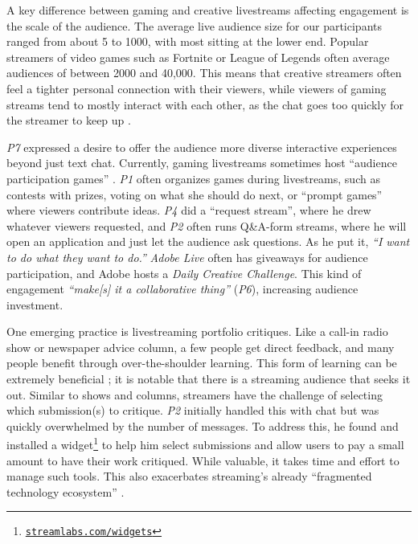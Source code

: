 A key difference between gaming and creative livestreams affecting engagement is the scale of the audience. The average live audience size for our participants ranged from about 5 to 1000, with most sitting at the lower end. Popular streamers of video games such as Fortnite or League of Legends often average audiences of between 2000 and 40,000. This means that creative streamers often feel a tighter personal connection with their viewers, while viewers of gaming streams tend to mostly interact with each other, as the chat goes too quickly for the streamer to keep up \cite{Lessel2017, Hu2017}.

\textit{P7} expressed a desire to offer the audience more diverse interactive experiences beyond just text chat. Currently, gaming livestreams sometimes host ``audience participation games'' \cite{Glickman2018}. \textit{P1} often organizes games during livestreams, such as contests with prizes, voting on what she should do next, or ``prompt games'' where viewers contribute ideas. \textit{P4} did a ``request stream'', where he drew whatever viewers requested, and \textit{P2} often runs Q\&A-form streams, where he will open an application and just let the audience ask questions. As he put it, \textit{``I want to do what they want to do.''} \textit{Adobe Live} often has giveaways for audience participation, and Adobe hosts a \textit{Daily Creative Challenge}. This kind of engagement \textit{``make[s] it a collaborative thing''} (\textit{P6}), increasing audience investment.

One emerging practice is livestreaming portfolio critiques. Like a call-in radio show or newspaper advice column, a few people get direct feedback, and many people benefit through over-the-shoulder learning. This form of learning can be extremely beneficial \cite{Lopez2010}; it is notable that there is a streaming audience that seeks it out. Similar to shows and columns, streamers have the challenge of selecting which submission(s) to critique. \textit{P2} initially handled this with chat but was quickly overwhelmed by the number of messages. To address this, he found and installed a widget\footnote{\href{https://streamlabs.com/widgets}{\nolinkurl{streamlabs.com/widgets}}} to help him select submissions and allow users to pay a small amount to have their work critiqued. While valuable, it takes time and effort to manage such tools. This also exacerbates streaming's already ``fragmented technology ecosystem'' \cite{Lu2019}.

